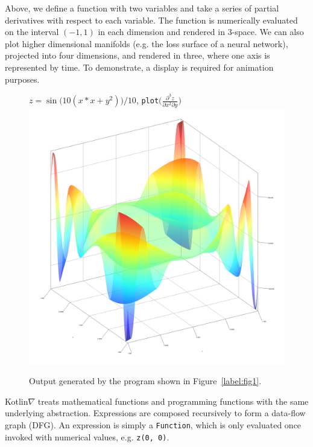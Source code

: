 \documentclass{article}
\newcommand{\squeezeup}{\vspace{-2.5mm}}
\begin{document}
    \squeezeup Above, we define a function with two variables and take a series of partial derivatives with respect to each variable. The function is numerically evaluated on the interval $(-1, 1)$ in each dimension and rendered in 3-space. We can also plot higher dimensional manifolds (e.g. the loss surface of a neural network), projected into four dimensions, and rendered in three, where one axis is represented by time. To demonstrate, a display is required for animation purposes.

    \squeezeup\begin{figure}[!htb]
                  \centering $z = \sin{\big(10(x*x + y^2)\big)} / 10$, \texttt{plot}$\Big(\frac{\partial^3z}{\partial{x^2}\partial{y}}\Big)$
                  \includegraphics[scale=0.43]{../figures/plot_result.png}
                  \squeezeup\caption{Output generated by the program shown in Figure~\ref{label:fig1}.}\squeezeup
    \end{figure}

    Kotlin$\nabla$ treats mathematical functions and programming functions with the same underlying abstraction. Expressions are composed recursively to form a data-flow graph (DFG). An expression is simply a \texttt{Function}, which is only evaluated once invoked with numerical values, e.g. \texttt{z(0, 0)}.
\end{document}
